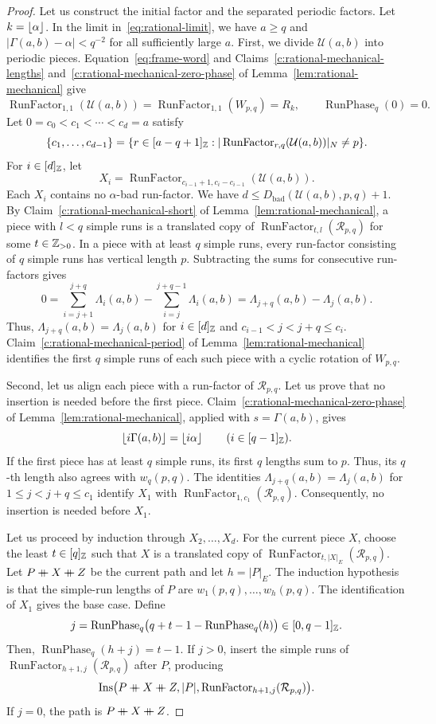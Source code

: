 \begin{proof}
Let us construct the initial factor and the separated periodic factors.
Let $k=\left\lfloor\alpha\right\rfloor$.
In the limit in~\eqref{eq:rational-limit}, we have
$a\ge q$ and $|\Gamma(a,b)-\alpha|<q^{-2}$ for all sufficiently large $a$.
First, we divide $\mathcal{U}(a,b)$ into periodic pieces.
Equation~\eqref{eq:frame-word} and Claims~\ref{c:rational-mechanical-lengths} and~\ref{c:rational-mechanical-zero-phase}
of Lemma~\ref{lem:rational-mechanical} give
\[
 \operatorname{RunFactor}_{1,1}(\mathcal U(a,b))
 =\operatorname{RunFactor}_{1,1}(W_{p,q})=R_k,\qquad
 \operatorname{RunPhase}_q(0)=0.
\]
Let $0=c_0<c_1<\cdots<c_d=a$ satisfy
\[
 \{c_1,\ldots,c_{d-1}\}
 =\{r\in[a-q+1]_{\mathbb Z}:|\operatorname{RunFactor}_{r,q}(\mathcal U(a,b))|_N\ne p\}.
\]
For $i\in[d]_{\mathbb Z}$, let
\[
 X_i=\operatorname{RunFactor}_{c_{i-1}+1,c_i-c_{i-1}}(\mathcal U(a,b)).
\]
Each $X_i$ contains no $\alpha$-bad run-factor. We have
$d\le D_{\mathrm{bad}}(\mathcal U(a,b),p,q)+1$.
By Claim~\ref{c:rational-mechanical-short} of Lemma~\ref{lem:rational-mechanical}, a piece with $l<q$ simple runs
is a translated copy of $\operatorname{RunFactor}_{t,l}(\mathcal R_{p,q})$ for some $t\in\mathbb Z_{>0}$.
In a piece with at least $q$ simple runs, every run-factor consisting of $q$ simple runs has
vertical length $p$. Subtracting the sums for consecutive run-factors gives
\[
 0=\sum_{i=j+1}^{j+q}\Lambda_i(a,b)-\sum_{i=j}^{j+q-1}\Lambda_i(a,b)
 =\Lambda_{j+q}(a,b)-\Lambda_j(a,b).
\]
Thus, $\Lambda_{j+q}(a,b)=\Lambda_j(a,b)$ for $i\in[d]_{\mathbb Z}$ and $c_{i-1}<j<j+q\le c_i$.
Claim~\ref{c:rational-mechanical-period} of Lemma~\ref{lem:rational-mechanical} identifies the first $q$ simple runs of each such piece with a cyclic rotation of $W_{p,q}$.

Second, let us align each piece with a run-factor of $\mathcal R_{p,q}$.
Let us prove that no insertion is needed before the first piece.
Claim~\ref{c:rational-mechanical-zero-phase} of Lemma~\ref{lem:rational-mechanical}, applied with $s=\Gamma(a,b)$, gives
\[
 \left\lfloor i\Gamma(a,b)\right\rfloor=\left\lfloor i\alpha\right\rfloor\qquad(i\in[q-1]_{\mathbb Z}).
\]
If the first piece has at least $q$ simple runs, its first $q$ lengths sum to $p$.
Thus, its $q$-th length also agrees with $w_q(p,q)$.
The identities $\Lambda_{j+q}(a,b)=\Lambda_j(a,b)$ for $1\le j<j+q\le c_1$ identify $X_1$ with $\operatorname{RunFactor}_{1,c_1}(\mathcal R_{p,q})$.
Consequently, no insertion is needed before $X_1$.

Let us proceed by induction through $X_2,\ldots,X_d$.
For the current piece $X$, choose the least $t\in[q]_{\mathbb Z}$ such that
$X$ is a translated copy of $\operatorname{RunFactor}_{t,|X|_E}(\mathcal R_{p,q})$.
Let $P\mathbin{+\mkern-10mu+} X\mathbin{+\mkern-10mu+} Z$ be the current path and let $h=|P|_E$.
The induction hypothesis is that the simple-run lengths of $P$ are $w_1(p,q),\ldots,w_h(p,q)$.
The identification of $X_1$ gives the base case. Define
\[
 j=\operatorname{RunPhase}_q\bigl(q+t-1-\operatorname{RunPhase}_q(h)\bigr)
 \in[0,q-1]_{\mathbb Z}.
\]
Then, $\operatorname{RunPhase}_q(h+j)=t-1$.
If $j>0$, insert the simple runs of $\operatorname{RunFactor}_{h+1,j}(\mathcal R_{p,q})$
after $P$, producing
\[
 \operatorname{Ins}\bigl(P\mathbin{+\mkern-10mu+} X\mathbin{+\mkern-10mu+} Z,|P|,\operatorname{RunFactor}_{h+1,j}(\mathcal R_{p,q})\bigr).
\]
If $j=0$, the path is $P\mathbin{+\mkern-10mu+} X\mathbin{+\mkern-10mu+} Z$.


\end{proof}
